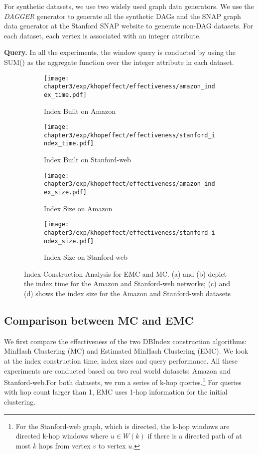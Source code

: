 For synthetic datasets, we use two widely used graph data generators. 
We use the \emph{DAGGER} generator \cite{yildirim2013dagger} to generate 
all the synthetic DAGs and the SNAP graph data generator at the
Stanford SNAP website to generate non-DAG datasets. For each dataset, each vertex is associated with an integer attribute.

\textbf{Query.} In all the experiments, the window query is conducted 
by using the SUM() as the aggregate function over the integer attribute in each dataset. 

\begin{figure*}[t]
\centering
\begin{subfigure}{0.23\textwidth}
  \texttt{[image: chapter3/exp/khopeffect/effectiveness/amazon\_index\_time.pdf]}
  \caption{Index Built on Amazon}
\end{subfigure}
\begin{subfigure}{0.23\textwidth}
  \texttt{[image: chapter3/exp/khopeffect/effectiveness/stanford\_index\_time.pdf]}
  \caption{Index Built on Stanford-web}
\end{subfigure}
\begin{subfigure}{0.23\textwidth}
  \texttt{[image: chapter3/exp/khopeffect/effectiveness/amazon\_index\_size.pdf]}
  \caption{Index Size on Amazon}
\end{subfigure}
\begin{subfigure}{0.23\textwidth}
  \texttt{[image: chapter3/exp/khopeffect/effectiveness/stanford\_index\_size.pdf]}
  \caption{Index Size on Stanford-web}
\end{subfigure}
\caption{Index Construction Analysis for EMC and MC. (a) and (b) 
depict the index time for the Amazon and Stanford-web networks; 
(c) and (d) shows the index size for the Amazon and Stanford-web datasets}
\label{fig:index_analysis_emc_mc}
\end{figure*}


\subsection{Comparison between MC and EMC}
We first compare the effectiveness of the two DBIndex 
construction algorithms: MinHash Clustering (MC) and Estimated 
MinHash Clustering (EMC). We look at 
the index construction time, index sizes and query performance. 
All these experiments are conducted based on two real world datasets: 
Amazon and Stanford-web.For both datasets, we run a series of k-hop queries.\footnote{For the Stanford-web graph, which is directed,
the k-hop windows are directed k-hop windows where $u \in W(k)$ if there is a directed path
of at most $k$ hops from vertex $v$ to vertex $u$.
} For queries with hop count larger than 1, 
EMC uses 1-hop information for the initial clustering. 

